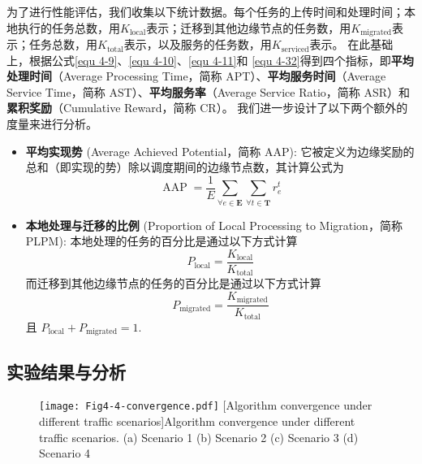 为了进行性能评估，我们收集以下统计数据。每个任务的上传时间和处理时间；本地执行的任务总数，用$K_{\operatorname{local}}$表示；迁移到其他边缘节点的任务数，用$K_{\operatorname{migrated}}$表示；任务总数，用$K_{\operatorname{total}}$表示，以及服务的任务数，用$K_{\operatorname{serviced}}$表示。
在此基础上，根据公式\ref{equ 4-9}、\ref{equ 4-10}、\ref{equ 4-11}和 \ref{equ 4-32}得到四个指标，即\textbf{平均处理时间}（Average Processing Time，简称 APT）、\textbf{平均服务时间}（Average Service Time，简称 AST）、\textbf{平均服务率}（Average Service Ratio，简称 ASR）和\textbf{累积奖励}（Cumulative Reward，简称 CR）。
我们进一步设计了以下两个额外的度量来进行分析。
\begin{itemize}
	\item \textbf{平均实现势} (Average Achieved Potential，简称 AAP): 它被定义为边缘奖励的总和（即实现的势）除以调度期间的边缘节点数，其计算公式为
		\begin{equation}
		 	 \operatorname{AAP} = \frac{1}{E}\sum_{\forall e \in \mathbf{E}} \sum_{\forall t \in \mathbf{T}} r_{e}^{t}
		\end{equation}
	\item \textbf{本地处理与迁移的比例} (Proportion of Local Processing to Migration，简称 PLPM): 本地处理的任务的百分比是通过以下方式计算
		\begin{equation}
			P_{\operatorname{local}} = \frac{K_{\operatorname{local}}}{K_{\operatorname{total}}}
		\end{equation}
		而迁移到其他边缘节点的任务的百分比是通过以下方式计算 
		\begin{equation}
			P_{\operatorname{migrated}} = \frac{K_{\operatorname{migrated}}}{K_{\operatorname{total}}}
		\end{equation}
		且 $P_{\operatorname{local}} +P_{\operatorname{migrated}} = 1$. 
\end{itemize}

\subsection{实验结果与分析}

\begin{figure}[h]
\centering
  \texttt{[image: Fig4-4-convergence.pdf]}
  [Algorithm convergence under different traffic scenarios]{Algorithm convergence under different traffic scenarios. (a) Scenario 1 (b) Scenario 2 (c) Scenario 3 (d) Scenario 4}
  \label{fig 4-4}
\end{figure} 

